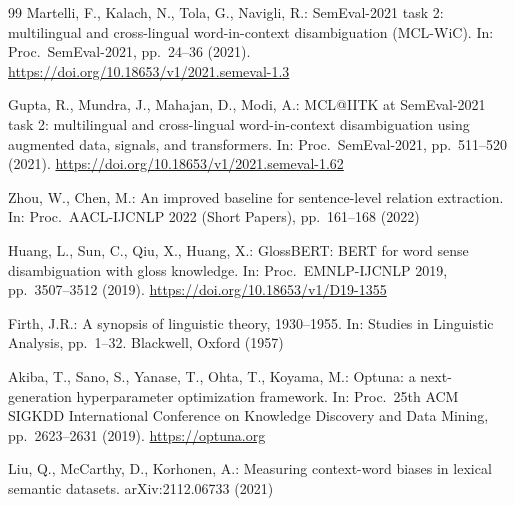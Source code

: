 \documentclass[runningheads]{llncs}
\begin{document}
\begin{thebibliography}{99}
Martelli, F., Kalach, N., Tola, G., Navigli, R.: SemEval-2021 task 2:
multilingual and cross-lingual word-in-context disambiguation (MCL-WiC). In:
Proc.\ SemEval-2021, pp.\ 24--36 (2021).
\url{https://doi.org/10.18653/v1/2021.semeval-1.3}

Gupta, R., Mundra, J., Mahajan, D., Modi, A.: MCL@IITK at SemEval-2021 task 2:
multilingual and cross-lingual word-in-context disambiguation using augmented
data, signals, and transformers. In: Proc.\ SemEval-2021, pp.\ 511--520 (2021).
\url{https://doi.org/10.18653/v1/2021.semeval-1.62}

Zhou, W., Chen, M.: An improved baseline for sentence-level relation extraction.
In: Proc.\ AACL-IJCNLP 2022 (Short Papers), pp.\ 161--168 (2022)

Huang, L., Sun, C., Qiu, X., Huang, X.: GlossBERT: BERT for word sense
disambiguation with gloss knowledge. In: Proc.\ EMNLP-IJCNLP 2019,
pp.\ 3507--3512 (2019). \url{https://doi.org/10.18653/v1/D19-1355}

Firth, J.R.: A synopsis of linguistic theory, 1930--1955. In: Studies in
Linguistic Analysis, pp.\ 1--32. Blackwell, Oxford (1957)

Akiba, T., Sano, S., Yanase, T., Ohta, T., Koyama, M.: Optuna: a next-generation
hyperparameter optimization framework. In: Proc.\ 25th ACM SIGKDD International
Conference on Knowledge Discovery and Data Mining, pp.\ 2623--2631 (2019).
\url{https://optuna.org}

Liu, Q., McCarthy, D., Korhonen, A.: Measuring context-word biases in lexical
semantic datasets. arXiv:2112.06733 (2021)

\end{thebibliography}
\end{document}
